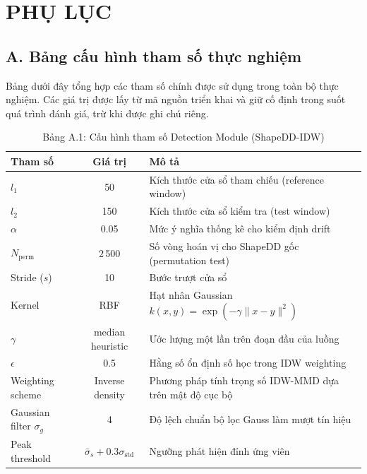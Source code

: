 \chapter*{PHỤ LỤC}

\section*{A. Bảng cấu hình tham số thực nghiệm}

Bảng dưới đây tổng hợp các tham số chính được sử dụng trong toàn bộ thực nghiệm. Các giá trị được lấy từ mã nguồn triển khai và giữ cố định trong suốt quá trình đánh giá, trừ khi được ghi chú riêng.

\begin{table}[H]
	\centering
	\caption*{Bảng A.1: Cấu hình tham số Detection Module (ShapeDD-IDW)}
	\begin{tabular}{|l|c|p{7cm}|}
		\hline
		\textbf{Tham số} & \textbf{Giá trị} & \textbf{Mô tả} \\
		\hline
			$l_1$ & 50 & Kích thước cửa sổ tham chiếu (reference window) \\
		$l_2$ & 150 & Kích thước cửa sổ kiểm tra (test window) \\
		$\alpha$ & 0.05 & Mức ý nghĩa thống kê cho kiểm định drift \\
		$N_{\text{perm}}$ & 2\,500 & Số vòng hoán vị cho ShapeDD gốc (permutation test) \\
		Stride ($s$) & 10 & Bước trượt cửa sổ \\
		Kernel & RBF & Hạt nhân Gaussian $k(x,y) = \exp(-\gamma \|x-y\|^2)$ \\
		$\gamma$ & median heuristic & Ước lượng một lần trên đoạn đầu của luồng \\
		$\epsilon$ & 0.5 & Hằng số ổn định số học trong IDW weighting \\
			Weighting scheme & Inverse density & Phương pháp tính trọng số IDW-MMD dựa trên mật độ cục bộ \\
		Gaussian filter $\sigma_g$ & 4 & Độ lệch chuẩn bộ lọc Gauss làm mượt tín hiệu \\
		Peak threshold & $\bar{\sigma}_s + 0.3\sigma_{\text{std}}$ & Ngưỡng phát hiện đỉnh ứng viên \\
		\hline
	\end{tabular}
\end{table}

